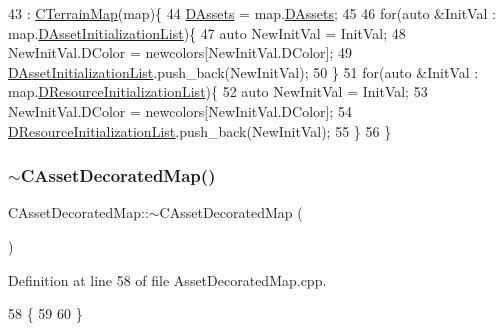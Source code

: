 \begin{DoxyCode}
43                                                                                                    : 
      \hyperlink{classCTerrainMap_a2ac9c0f2622d06b8e0b1f5d67199f1ea}{CTerrainMap}(map)\{
44     \hyperlink{classCAssetDecoratedMap_a94eeed5b16141169b1ba6cb3842055aa}{DAssets} = map.\hyperlink{classCAssetDecoratedMap_a94eeed5b16141169b1ba6cb3842055aa}{DAssets};
45 
46     \textcolor{keywordflow}{for}(\textcolor{keyword}{auto} &InitVal : map.\hyperlink{classCAssetDecoratedMap_a2b7bf2e9a19a9173093cef32048608c2}{DAssetInitializationList})\{
47         \textcolor{keyword}{auto} NewInitVal = InitVal;
48         NewInitVal.DColor = newcolors[NewInitVal.DColor];
49         \hyperlink{classCAssetDecoratedMap_a2b7bf2e9a19a9173093cef32048608c2}{DAssetInitializationList}.push\_back(NewInitVal);
50     \}
51     \textcolor{keywordflow}{for}(\textcolor{keyword}{auto} &InitVal : map.\hyperlink{classCAssetDecoratedMap_ab4c78aeb90280ea98a3aa542cdb7f8cc}{DResourceInitializationList})\{
52         \textcolor{keyword}{auto} NewInitVal = InitVal;
53         NewInitVal.DColor = newcolors[NewInitVal.DColor];
54         \hyperlink{classCAssetDecoratedMap_ab4c78aeb90280ea98a3aa542cdb7f8cc}{DResourceInitializationList}.push\_back(NewInitVal);
55     \}
56 \}
\end{DoxyCode}
\hypertarget{classCAssetDecoratedMap_ab91521b2e06dbac041add78a32c1476a}{}\label{classCAssetDecoratedMap_ab91521b2e06dbac041add78a32c1476a} 
\subsubsection{\texorpdfstring{$\sim$\+C\+Asset\+Decorated\+Map()}{~CAssetDecoratedMap()}}
{\footnotesize\ttfamily C\+Asset\+Decorated\+Map\+::$\sim$\+C\+Asset\+Decorated\+Map (\begin{DoxyParamCaption}{ }\end{DoxyParamCaption})}



Definition at line 58 of file Asset\+Decorated\+Map.\+cpp.


\begin{DoxyCode}
58                                        \{
59     
60 \}
\end{DoxyCode}


